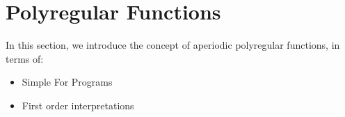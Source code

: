 \newpage
\section{Polyregular Functions}
\label{sec:polyregular}

In this section, we introduce the concept of aperiodic polyregular functions,
in terms of:
\begin{itemize}
    \item Simple For Programs
    \item First order interpretations
\end{itemize}
